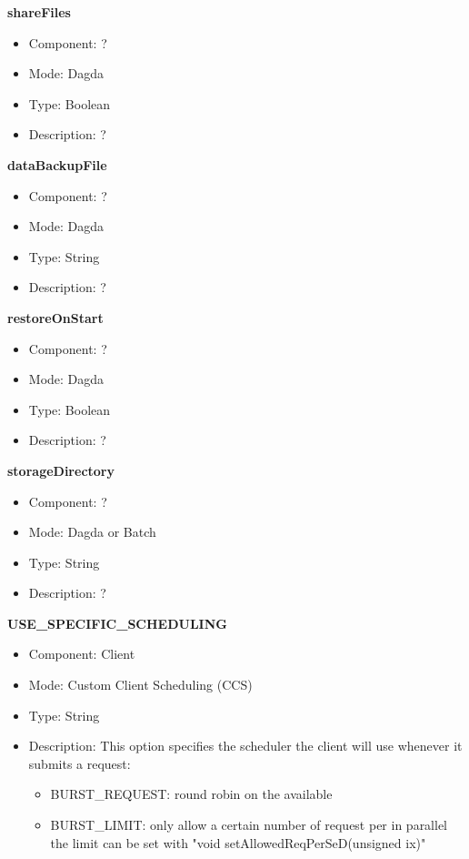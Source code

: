 \begin{description}
\item{\bf{shareFiles}}
  \begin{itemize}
  \item Component: ?
  \item Mode: Dagda
  \item Type: Boolean
  \item Description: ?
  \end{itemize}

\item{\bf{dataBackupFile}}
  \begin{itemize}
  \item Component: ?
  \item Mode: Dagda
  \item Type: String
  \item Description: ? 
  \end{itemize}

\item{\bf{restoreOnStart}}
  \begin{itemize}
  \item Component: ?
  \item Mode: Dagda
  \item Type: Boolean
  \item Description: ?
  \end{itemize}

\item{\bf{storageDirectory}}
  \begin{itemize}
  \item Component: ?
  \item Mode: Dagda or Batch
  \item Type: String
  \item Description: ? 
  \end{itemize}

\item{\bf{USE\_SPECIFIC\_SCHEDULING}}
  \begin{itemize}
  \item Component: Client
  \item Mode: Custom Client Scheduling (CCS)
  \item Type: String
  \item Description: 
    This option specifies the scheduler the client will use whenever it submits
    a request:
    \begin{itemize}
    \item BURST\_REQUEST: round robin on the available \sed
    \item BURST\_LIMIT: only allow a certain number of request per \sed in
      parallel the limit can be set with "void
      setAllowedReqPerSeD(unsigned ix)"
    \end{itemize}
  \end{itemize}


\end{description}
